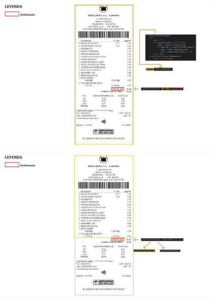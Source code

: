 \documentclass{beamer}
\begin{document}
		\begin{frame}
			\begin{figure}
				\centering
				\includegraphics[width=1\linewidth]{imgEspecifiques/ticketExtraccioB.png}
				\label{fig:ticketExtraccioB}
			\end{figure}
		\end{frame}
		
		\begin{frame}
			\begin{figure}
				\centering
				\includegraphics[width=1\linewidth]{imgEspecifiques/ticketExtraccioC.png}
				\label{fig:ticketExtraccioC}
			\end{figure}
		\end{frame}
		
\end{document}
